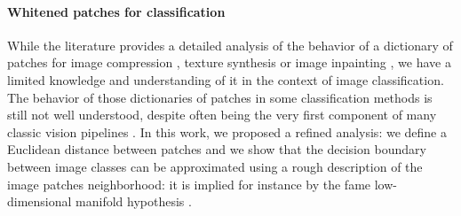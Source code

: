 \documentclass{article} %
\begin{document}
\paragraph{Whitened patches for classification} 
While the literature provides a detailed analysis of the behavior of a dictionary of patches for image compression
\citep{wallace1992jpeg}, texture synthesis \citep{efros1999texture} or image inpainting \citep{criminisi2004region}, we have a limited knowledge and understanding of it in the context of image classification. 
The behavior of those dictionaries of patches in some classification methods is still not well understood, despite often being the very first component of many classic vision pipelines \citep{perronnin2010improving,lowe2004distinctive,oyallon2018scattering}. In this work, we proposed a refined analysis: we define a Euclidean distance between patches and we show that the decision boundary between image classes can be approximated using a rough description of the image patches neighborhood:  it is implied for instance by the fame low-dimensional manifold hypothesis 
\citep{fefferman2016testing}.


\end{document}
